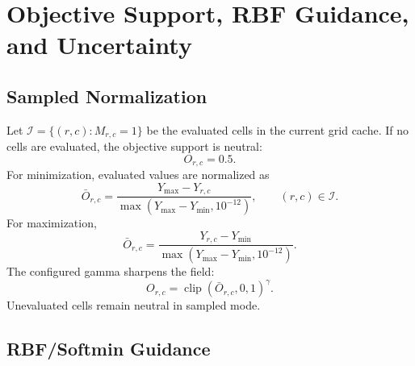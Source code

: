 \documentclass[11pt]{article}
\newcommand{\clip}{\operatorname{clip}}
\begin{document}
\section{Objective Support, RBF Guidance, and Uncertainty}

\subsection{Sampled Normalization}

Let $\mathcal{I}=\{(r,c):M_{r,c}=1\}$ be the evaluated cells in the current
grid cache. If no cells are evaluated, the objective support is neutral:
\begin{equation}
O_{r,c}=0.5.
\label{eq:neutral-objective}
\end{equation}
For minimization, evaluated values are normalized as
\begin{equation}
\bar O_{r,c}
= \frac{Y_{\max}-Y_{r,c}}{\max(Y_{\max}-Y_{\min},10^{-12})},
\qquad (r,c)\in\mathcal{I}.
\label{eq:min-support}
\end{equation}
For maximization,
\begin{equation}
\bar O_{r,c}
= \frac{Y_{r,c}-Y_{\min}}{\max(Y_{\max}-Y_{\min},10^{-12})}.
\label{eq:max-support}
\end{equation}
The configured gamma sharpens the field:
\begin{equation}
O_{r,c}=\clip(\bar O_{r,c},0,1)^\gamma.
\label{eq:gamma-support}
\end{equation}
Unevaluated cells remain neutral in sampled mode.

\subsection{RBF/Softmin Guidance}
\end{document}
